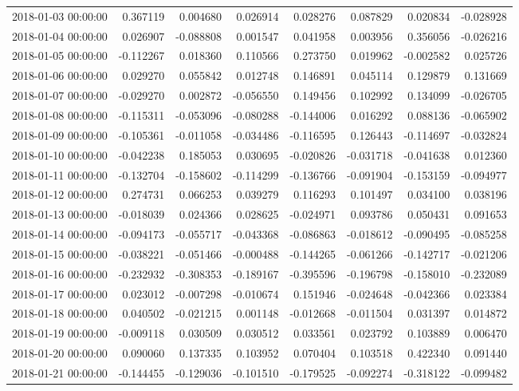 \begin{tabular}{lrrrrrrr}
2018-01-03 00:00:00 & 0.367119 & 0.004680 & 0.026914 & 0.028276 & 0.087829 & 0.020834 & -0.028928 \\
2018-01-04 00:00:00 & 0.026907 & -0.088808 & 0.001547 & 0.041958 & 0.003956 & 0.356056 & -0.026216 \\
2018-01-05 00:00:00 & -0.112267 & 0.018360 & 0.110566 & 0.273750 & 0.019962 & -0.002582 & 0.025726 \\
2018-01-06 00:00:00 & 0.029270 & 0.055842 & 0.012748 & 0.146891 & 0.045114 & 0.129879 & 0.131669 \\
2018-01-07 00:00:00 & -0.029270 & 0.002872 & -0.056550 & 0.149456 & 0.102992 & 0.134099 & -0.026705 \\
2018-01-08 00:00:00 & -0.115311 & -0.053096 & -0.080288 & -0.144006 & 0.016292 & 0.088136 & -0.065902 \\
2018-01-09 00:00:00 & -0.105361 & -0.011058 & -0.034486 & -0.116595 & 0.126443 & -0.114697 & -0.032824 \\
2018-01-10 00:00:00 & -0.042238 & 0.185053 & 0.030695 & -0.020826 & -0.031718 & -0.041638 & 0.012360 \\
2018-01-11 00:00:00 & -0.132704 & -0.158602 & -0.114299 & -0.136766 & -0.091904 & -0.153159 & -0.094977 \\
2018-01-12 00:00:00 & 0.274731 & 0.066253 & 0.039279 & 0.116293 & 0.101497 & 0.034100 & 0.038196 \\
2018-01-13 00:00:00 & -0.018039 & 0.024366 & 0.028625 & -0.024971 & 0.093786 & 0.050431 & 0.091653 \\
2018-01-14 00:00:00 & -0.094173 & -0.055717 & -0.043368 & -0.086863 & -0.018612 & -0.090495 & -0.085258 \\
2018-01-15 00:00:00 & -0.038221 & -0.051466 & -0.000488 & -0.144265 & -0.061266 & -0.142717 & -0.021206 \\
2018-01-16 00:00:00 & -0.232932 & -0.308353 & -0.189167 & -0.395596 & -0.196798 & -0.158010 & -0.232089 \\
2018-01-17 00:00:00 & 0.023012 & -0.007298 & -0.010674 & 0.151946 & -0.024648 & -0.042366 & 0.023384 \\
2018-01-18 00:00:00 & 0.040502 & -0.021215 & 0.001148 & -0.012668 & -0.011504 & 0.031397 & 0.014872 \\
2018-01-19 00:00:00 & -0.009118 & 0.030509 & 0.030512 & 0.033561 & 0.023792 & 0.103889 & 0.006470 \\
2018-01-20 00:00:00 & 0.090060 & 0.137335 & 0.103952 & 0.070404 & 0.103518 & 0.422340 & 0.091440 \\
2018-01-21 00:00:00 & -0.144455 & -0.129036 & -0.101510 & -0.179525 & -0.092274 & -0.318122 & -0.099482 \\

\end{tabular}

